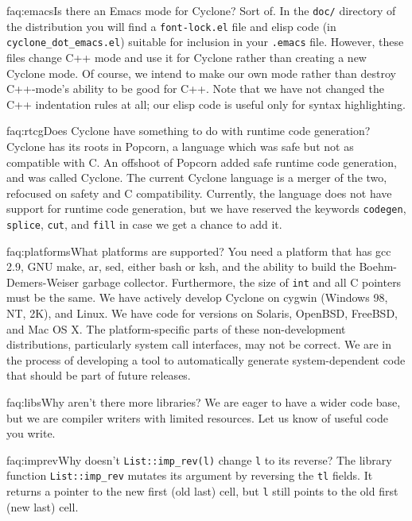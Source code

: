\begin{faqa}{faq:emacs}{Is there an Emacs mode for Cyclone?}
Sort of.  In the \texttt{doc/} directory of the distribution you will
find a \texttt{font-lock.el} file and elisp code (in
\texttt{cyclone_dot_emacs.el}) suitable for inclusion in your
\texttt{.emacs} file.  However, these files change C++ mode and use it
for Cyclone rather than creating a new Cyclone mode.  Of course, we
intend to make our own mode rather than destroy C++-mode's ability to
be good for C++.  Note that we have not changed the C++ indentation
rules at all; our elisp code is useful only for syntax highlighting.
\end{faqa}

\begin{faqa}{faq:rtcg}{Does Cyclone have something to do with runtime code generation?}
Cyclone has its roots in Popcorn, a language which was safe but not as
compatible with C\@.  An offshoot of Popcorn added safe runtime code
generation, and was called Cyclone.  The current Cyclone language is a
merger of the two, refocused on safety and C compatibility.
Currently, the language does not have support for runtime code
generation, but we have reserved the keywords \texttt{codegen},
\texttt{splice}, \texttt{cut}, and \texttt{fill} in case we get a
chance to add it.
\end{faqa}

\begin{faqa}{faq:platforms}{What platforms are supported?}
You need a platform that has gcc 2.9, GNU make, ar, sed, either bash or ksh,
and the ability to build the Boehm-Demers-Weiser garbage collector.
Furthermore, the size of \texttt{int} and all C pointers must be the same.
We have actively develop Cyclone on cygwin (Windows 98, NT, 2K), and Linux.
We have code for versions on Solaris, OpenBSD, FreeBSD, and Mac OS X.  The
platform-specific parts of these non-development distributions, particularly
system call interfaces, may not be correct.  We are in the process of
developing a tool to automatically generate system-dependent code that
should be part of future releases.
\end{faqa}

\begin{faqa}{faq:libs}{Why aren't there more libraries?}
We are eager to have a wider code base, but we are compiler writers
with limited resources.  Let us know of useful code you write.
\end{faqa}

\begin{faqa}{faq:imprev}{Why doesn't \texttt{List::imp_rev(l)} change \texttt{l} to its reverse?} 
The library function \texttt{List::imp_rev} mutates its argument by
reversing the \texttt{tl} fields.  It returns a pointer to the new
first (old last) cell, but \texttt{l} still points to the old first
(new last) cell.
\end{faqa}

